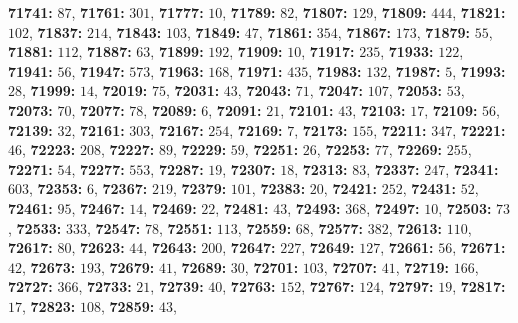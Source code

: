 \textsf{\bfseries 71741:} $87$, \textsf{\bfseries 71761:} $301$, \textsf{\bfseries 71777:} $10$, \textsf{\bfseries 71789:} $82$, \textsf{\bfseries 71807:} $129$, \textsf{\bfseries 71809:} $444$, \textsf{\bfseries 71821:} $102$, \textsf{\bfseries 71837:} $214$, \textsf{\bfseries 71843:} $103$, \textsf{\bfseries 71849:} $47$, \textsf{\bfseries 71861:} $354$, \textsf{\bfseries 71867:} $173$, \textsf{\bfseries 71879:} $55$, \textsf{\bfseries 71881:} $112$, \textsf{\bfseries 71887:} $63$, \textsf{\bfseries 71899:} $192$, \textsf{\bfseries 71909:} $10$, \textsf{\bfseries 71917:} $235$, \textsf{\bfseries 71933:} $122$, \textsf{\bfseries 71941:} $56$, \textsf{\bfseries 71947:} $573$, \textsf{\bfseries 71963:} $168$, \textsf{\bfseries 71971:} $435$, \textsf{\bfseries 71983:} $132$, \textsf{\bfseries 71987:} $5$, \textsf{\bfseries 71993:} $28$, \textsf{\bfseries 71999:} $14$, \textsf{\bfseries 72019:} $75$, \textsf{\bfseries 72031:} $43$, \textsf{\bfseries 72043:} $71$, \textsf{\bfseries 72047:} $107$, \textsf{\bfseries 72053:} $53$, \textsf{\bfseries 72073:} $70$, \textsf{\bfseries 72077:} $78$, \textsf{\bfseries 72089:} $6$, \textsf{\bfseries 72091:} $21$, \textsf{\bfseries 72101:} $43$, \textsf{\bfseries 72103:} $17$, \textsf{\bfseries 72109:} $56$, \textsf{\bfseries 72139:} $32$, \textsf{\bfseries 72161:} $303$, \textsf{\bfseries 72167:} $254$, \textsf{\bfseries 72169:} $7$, \textsf{\bfseries 72173:} $155$, \textsf{\bfseries 72211:} $347$, \textsf{\bfseries 72221:} $46$, \textsf{\bfseries 72223:} $208$, \textsf{\bfseries 72227:} $89$, \textsf{\bfseries 72229:} $59$, \textsf{\bfseries 72251:} $26$, \textsf{\bfseries 72253:} $77$, \textsf{\bfseries 72269:} $255$, \textsf{\bfseries 72271:} $54$, \textsf{\bfseries 72277:} $553$, \textsf{\bfseries 72287:} $19$, \textsf{\bfseries 72307:} $18$, \textsf{\bfseries 72313:} $83$, \textsf{\bfseries 72337:} $247$, \textsf{\bfseries 72341:} $603$, \textsf{\bfseries 72353:} $6$, \textsf{\bfseries 72367:} $219$, \textsf{\bfseries 72379:} $101$, \textsf{\bfseries 72383:} $20$, \textsf{\bfseries 72421:} $252$, \textsf{\bfseries 72431:} $52$, \textsf{\bfseries 72461:} $95$, \textsf{\bfseries 72467:} $14$, \textsf{\bfseries 72469:} $22$, \textsf{\bfseries 72481:} $43$, \textsf{\bfseries 72493:} $368$, \textsf{\bfseries 72497:} $10$, \textsf{\bfseries 72503:} $73$, \textsf{\bfseries 72533:} $333$, \textsf{\bfseries 72547:} $78$, \textsf{\bfseries 72551:} $113$, \textsf{\bfseries 72559:} $68$, \textsf{\bfseries 72577:} $382$, \textsf{\bfseries 72613:} $110$, \textsf{\bfseries 72617:} $80$, \textsf{\bfseries 72623:} $44$, \textsf{\bfseries 72643:} $200$, \textsf{\bfseries 72647:} $227$, \textsf{\bfseries 72649:} $127$, \textsf{\bfseries 72661:} $56$, \textsf{\bfseries 72671:} $42$, \textsf{\bfseries 72673:} $193$, \textsf{\bfseries 72679:} $41$, \textsf{\bfseries 72689:} $30$, \textsf{\bfseries 72701:} $103$, \textsf{\bfseries 72707:} $41$, \textsf{\bfseries 72719:} $166$, \textsf{\bfseries 72727:} $366$, \textsf{\bfseries 72733:} $21$, \textsf{\bfseries 72739:} $40$, \textsf{\bfseries 72763:} $152$, \textsf{\bfseries 72767:} $124$, \textsf{\bfseries 72797:} $19$, \textsf{\bfseries 72817:} $17$, \textsf{\bfseries 72823:} $108$, \textsf{\bfseries 72859:} $43$, 
